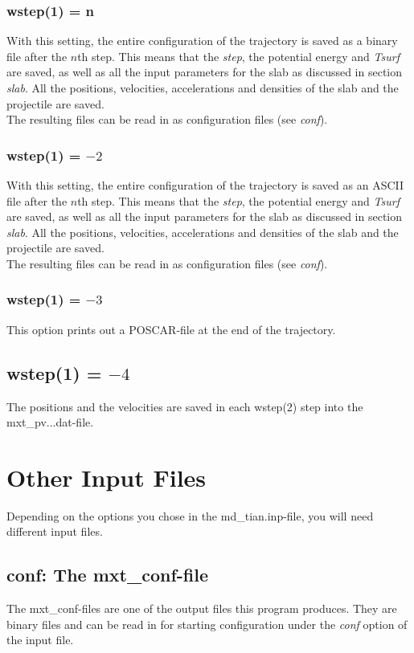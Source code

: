 \documentclass[twoside, 11pt, titlepage, captions=nooneline, a4paper, headsepline]{scrbook}%
\begin{document}
\subsubsection*{wstep(1) = n}
With this setting, the entire configuration of the trajectory is saved as a binary file after the $n$th step. This means that the \textit{step}, the potential energy and \emph{Tsurf} are saved, as well as all the input parameters for the slab as discussed in section \emph{slab}. All the positions, velocities, accelerations and densities of the slab and the projectile are saved.\\
The resulting files can be read in as configuration files (see \textit{conf}).
\subsubsection*{wstep(1) = $-2$}
With this setting, the entire configuration of the trajectory is saved as an ASCII file after the $n$th step. This means that the \textit{step}, the potential energy and \emph{Tsurf} are saved, as well as all the input parameters for the slab as discussed in section \emph{slab}. All the positions, velocities, accelerations and densities of the slab and the projectile are saved.\\
The resulting files can be read in as configuration files (see \textit{conf}).
\subsubsection*{wstep(1) = $-3$}
This option prints out a POSCAR-file at the end of the trajectory.
\subsection*{wstep(1) = $-4$}
The positions and the velocities are saved in each wstep(2) step into the mxt\_pv...dat-file.

\section{Other Input Files}
Depending on the options you chose in the md\_tian.inp-file, you will need different input files.
\subsection{conf: The mxt\_conf-file}
The mxt\_conf-files are one of the output files this program produces. They are binary files and can be read in for starting configuration under the \emph{conf} option of the input file.
\end{document}
